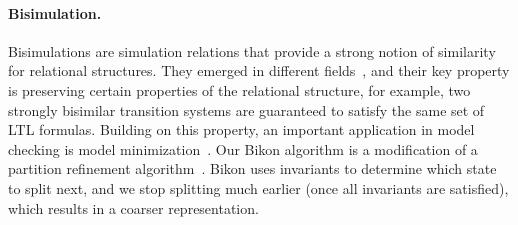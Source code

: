 
\paragraph{Bisimulation.} Bisimulations are simulation relations that
provide a strong notion of similarity for relational structures. They
emerged in different fields~\cite{OriginsBisim}, and their key
property is preserving certain properties of the relational structure,
for example, two strongly bisimilar transition systems are guaranteed
to satisfy the same set of LTL formulas. Building on this property, an
important application in model checking is model
minimization~\cite{BisimMin}. Our Bikon algorithm is a modification of
a partition refinement algorithm~\cite{PartRefine}. Bikon uses
invariants to determine which state to split next, and we stop
splitting much earlier (once all invariants are satisfied), which
results in a coarser representation.



